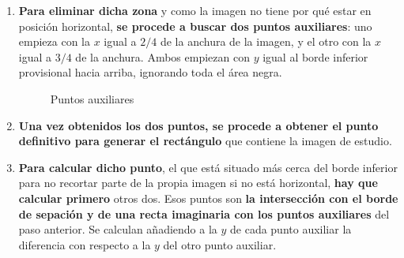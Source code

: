 \begin{enumerate}
\begin{enumerate}[label*=\arabic*.]
    \begin{enumerate}[label*=\arabic*.]
    \item\label{algoritmo_coroides:recortar_sobrante} \textbf{Para eliminar dicha zona} y como la imagen no tiene
      por qué estar en posición horizontal, \textbf{se procede a
        buscar dos puntos auxiliares}: uno empieza con la $x$ igual a
      $2/4$ de la anchura de la imagen, y el otro con la $x$ igual a
      $3/4$ de la anchura. Ambos empiezan con $y$ igual al borde
      inferior provisional hacia arriba, ignorando toda el área negra.

      \begin{figure}[H]
        \caption{Puntos auxiliares}
        \centering \setlength\fboxsep{0pt} \setlength\fboxrule{0.5pt}
      \end{figure}

    \item \textbf{Una vez obtenidos los dos puntos, se procede a
        obtener el punto definitivo para generar el rectángulo} que
      contiene la imagen de estudio.

    \item \textbf{Para calcular dicho punto}, el que está situado más
      cerca del borde inferior para no recortar parte de la propia
      imagen si no está horizontal, \textbf{hay que calcular primero}
      otros dos. Esos puntos son \textbf{la intersección con el borde
        de sepación y de una recta imaginaria con los puntos
        auxiliares} del paso anterior. Se calculan añadiendo a la $y$
      de cada punto auxiliar la diferencia con respecto a la $y$ del
      otro punto auxiliar.


\end{enumerate}
\end{enumerate}
\end{enumerate}
